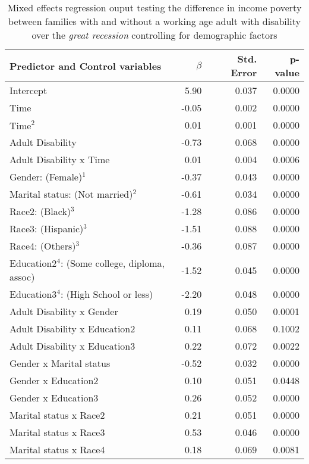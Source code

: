 \begin{table}[H]
\footnotesize
\centering
\caption{Mixed effects regression ouput testing the difference in income poverty between families with and without a working age adult with disability over the {\emph{great recession}} controlling for demographic factors } 
\begin{threeparttable}
\begin{tabular}{lrrr}
  \hline
  Predictor and Control variables & $\beta$ & Std. Error & p-value \\ 
  \hline
  Intercept & 5.90 & 0.037 & 0.0000 \\ 
  Time & -0.05 & 0.002 & 0.0000 \\ 
  $\text{Time}^2$ & 0.01 & 0.001 & 0.0000 \\ 
  Adult Disability & -0.73 & 0.068 & 0.0000 \\ 
  Adult Disability x Time & 0.01 & 0.004 & 0.0006 \\ 
  Gender: (Female)$^1$ & -0.37 & 0.043 & 0.0000 \\ 
  Marital status: (Not married)$^2$ & -0.61 & 0.034 & 0.0000 \\ 
  Race2: (Black)$^3$ & -1.28 & 0.086 & 0.0000 \\ 
  Race3: (Hispanic)$^3$ & -1.51 & 0.088 & 0.0000 \\ 
  Race4: (Others)$^3$ & -0.36 & 0.087 & 0.0000 \\ 
  Education2$^4$: (Some college, diploma, assoc) & -1.52 & 0.045 & 0.0000 \\ 
  Education3$^4$: (High School or less) & -2.20 & 0.048 & 0.0000 \\ 
  Adult Disability x Gender & 0.19 & 0.050 & 0.0001 \\ 
  Adult Disability x Education2 & 0.11 & 0.068 & 0.1002 \\ 
  Adult Disability x Education3 & 0.22 & 0.072 & 0.0022 \\ 
  Gender x Marital status & -0.52 & 0.032 & 0.0000 \\ 
  Gender x Education2 & 0.10 & 0.051 & 0.0448 \\ 
  Gender x Education3 & 0.26 & 0.052 & 0.0000 \\ 
  Marital status x Race2 & 0.21 & 0.051 & 0.0000 \\ 
  Marital status x Race3 & 0.53 & 0.046 & 0.0000 \\ 
  Marital status x Race4 & 0.18 & 0.069 & 0.0081 \\ 

\end{tabular}
\end{threeparttable}
\end{table}
